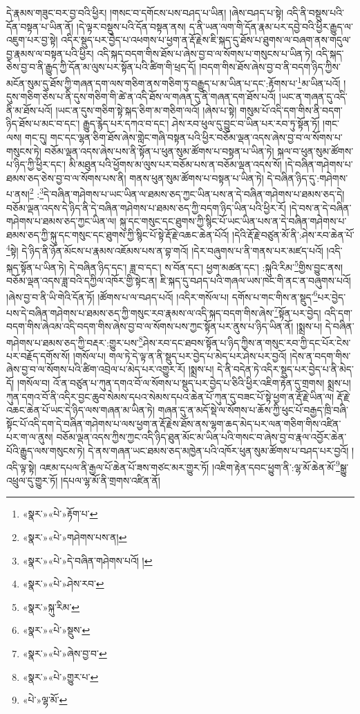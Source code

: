 དེ་རྣམས་གཟུང་བར་བྱ་བའི་ཕྱིར། །གསང་བ་དགོངས་པས་བཤད་པ་ཡིན། །ཞེས་བཤད་པ་སྟེ། འདི་ནི་བསྡུས་པའི་དོན་བསྟན་པ་ཡིན་ནོ། །དེ་ལྟར་བསྡུས་པའི་དོན་བསྟན་ནས། ད་ནི་ཡན་ལག་གི་དོན་རྣམ་པར་དབྱེ་བའི་ཕྱིར་རྒྱུད་ལ་འཇུག་པར་བྱ་སྟེ། འདིར་སྡུད་པར་བྱེད་པ་འཕགས་པ་ཕྱག་ན་རྡོ་རྗེས་ཇི་སྐད་དུ་ཐོས་པ་ཐུགས་ལ་བཞག་ནས་གདུལ་བྱ་རྣམས་ལ་བསྟན་པའི་ཕྱིར། འདི་སྐད་བདག་གིས་ཐོས་པ་ཞེས་བྱ་བ་ལ་སོགས་པ་གསུངས་པ་ཡིན་ཏེ། འདི་སྐད་ཅེས་བྱ་བ་ནི་རྒྱུད་ཀྱི་དོན་མ་ལུས་པར་སྟོན་པའི་ཚིག་གི་ཕྲད་དོ། །བདག་གིས་ཐོས་ཞེས་བྱ་བ་ནི་བདག་ཉིད་ཀྱིས་མངོན་སུམ་དུ་ཐོས་ཀྱི་གཞན་དག་ལས་གཅིག་ནས་གཅིག་ཏུ་བརྒྱུད་པ་མ་ཡིན་པ་དང་:རྟོགས་པ་\footnote{«སྣར་»«པེ་»རྟོག་པ་}མ་ཡིན་པའོ། །དུས་གཅིག་ཅེས་པ་ནི་དུས་གཅིག་གི་ཚེ་ན་འདི་ཐོས་ལ་གཞན་དུ་ནི་གཞན་དག་ཐོས་པའོ། །ཡང་ན་གཞན་དུ་འདི་ནི་མ་ཐོས་པའོ། །ཡང་ན་དུས་གཅིག་སྟེ་སྐད་ཅིག་མ་གཅིག་ལའོ། །ཞེས་པ་སྟེ། གསུམ་པོ་འདི་དག་གིས་ནི་བདག་ཉིད་ཐོས་པ་མང་བ་དང་། རྒྱུད་རྙེད་པར་དཀའ་བ་དང་། ཤེས་རབ་ཕུལ་དུ་བྱུང་བ་ཡིན་པར་རབ་ཏུ་སྟོན་ཏོ། །གང་ལས། གང་དུ། གང་དང་ལྷན་ཅིག་ཐོས་ཞེས་གླེང་གཞི་བསྟན་པའི་ཕྱིར་བཅོམ་ལྡན་འདས་ཞེས་བྱ་བ་ལ་སོགས་པ་གསུངས་ཏེ། བཅོམ་ལྡན་འདས་ཞེས་པས་ནི་སྟོན་པ་ཕུན་སུམ་ཚོགས་པ་བསྟན་པ་ཡིན་ཏེ། སྐལ་བ་ཕུན་སུམ་ཚོགས་པ་ཉིད་ཀྱི་ཕྱིར་དང་། མི་མཐུན་པའི་ཕྱོགས་མ་ལུས་པར་བཅོམ་པས་ན་བཅོམ་ལྡན་འདས་སོ། །དེ་བཞིན་གཤེགས་པ་ཐམས་ཅད་ཅེས་བྱ་བ་ལ་སོགས་པས་ནི། གནས་ཕུན་སུམ་ཚོགས་པ་བསྟན་པ་ཡིན་ཏེ། དེ་བཞིན་ཉིད་དུ་:གཤེགས་པ་ནས།\footnote{«སྣར་»«པེ་»གཤེགས་པས་ན།} :\footnote{«སྣར་»«པེ་»དེ་བཞིན་གཤེགས་པའོ། །}དེ་བཞིན་གཤེགས་པ་ཡང་ཡིན་ལ་ཐམས་ཅད་ཀྱང་ཡིན་པས་ན་དེ་བཞིན་གཤེགས་པ་ཐམས་ཅད་དེ། བཅོམ་ལྡན་འདས་དེ་ཉིད་ནི་དེ་བཞིན་གཤེགས་པ་ཐམས་ཅད་ཀྱི་བདག་ཉིད་ཡིན་པའི་ཕྱིར་རོ། །དེ་བས་ན་དེ་བཞིན་གཤེགས་པ་ཐམས་ཅད་ཀྱང་ཡིན་ལ། སྐུ་དང་གསུང་དང་ཐུགས་ཀྱི་སྙིང་པོ་ཡང་ཡིན་པས་ན་དེ་བཞིན་གཤེགས་པ་ཐམས་ཅད་ཀྱི་སྐུ་དང་གསུང་དང་ཐུགས་ཀྱི་སྙིང་པོ་སྟེ་རྡོ་རྗེ་འཆང་ཆེན་པོའོ། །དེའི་རྡོ་རྗེ་བཙུན་མོ་ནི་:ཤེས་རབ་ཆེན་པོ་\footnote{«སྣར་»«པེ་»ཤེས་རབ་}སྟེ། དེ་ཉིད་ནི་ཉོན་མོངས་པ་རྣམས་འཇོམས་པས་ན་བྷ་གའོ། །དེར་བཞུགས་པ་ནི་གནས་པར་མཛད་པའོ། །འདི་སྐད་སྟོན་པ་ཡིན་ཏེ། དེ་བཞིན་ཉིད་དང་། ཟླ་བ་དང་། ས་བོན་དང་། ཕྱག་མཚན་དང་། :སྐུའི་རིམ་\footnote{«སྣར་»སྐུ་རིམ་}གྱིས་བྱུང་ནས། བཅོམ་ལྡན་འདས་ཟླ་བའི་དཀྱིལ་འཁོར་གྱི་སྟེང་ན། ཇི་སྐད་དུ་བཤད་པའི་གཞལ་ཡས་ཁང་གི་ནང་ན་བཞུགས་པའོ། །ཞེས་བྱ་བ་ནི་ཡི་གེའི་དོན་ཏོ། །ཚོགས་པ་ལ་བཤད་པའོ། །འདིར་གསོལ་པ། དགོས་པ་གང་གིས་ན་སྡུད་\footnote{«སྣར་»«པེ་»སྡུས་}པར་བྱེད་པས་དེ་བཞིན་གཤེགས་པ་ཐམས་ཅད་ཀྱི་གསུང་རབ་རྣམས་ལ་འདི་སྐད་བདག་གིས་ཞེས་\footnote{«སྣར་»«པེ་»ཞེས་བྱ་བ་}སྟོན་པར་བྱེད། འདི་དག་བདག་གིས་ཞེའམ་འདི་བདག་གིས་ཞེས་བྱ་བ་ལ་སོགས་པས་ཀྱང་སྟོན་པར་ནུས་པ་ཉིད་ཡིན་ནོ། །སྨྲས་པ། དེ་བཞིན་གཤེགས་པ་ཐམས་ཅད་ཀྱི་བརྡར་:གྱུར་པས་\footnote{«སྣར་»«པེ་»གྱུར་པ་}ཤེས་རབ་དང་ཐབས་སྟོན་པ་ཉིད་ཀྱིས་ན་གསུང་རབ་ཀྱི་དང་པོར་ངེས་པར་བརྗོད་དགོས་སོ། །གསོལ་པ། གལ་ཏེ་དེ་ལྟ་ན་ནི་སྡུད་པར་བྱེད་པ་མེད་པར་ཤེས་པར་བྱའོ། །དེས་ན་བདག་གིས་ཞེས་བྱ་བ་ལ་སོགས་པའི་ཚིག་འབྲེལ་པ་མེད་པར་འགྱུར་རོ། །སྨྲས་པ། དེ་ནི་བདེན་ཏེ་འདིར་སྡུད་པར་བྱེད་པ་ནི་མེད་དོ། །གསོལ་བ། འོ་ན་བཙུན་པ་ཀུན་དགའ་བོ་ལ་སོགས་པ་སྡུད་པར་བྱེད་པ་ཅིའི་ཕྱིར་འཇིག་རྟེན་དུ་གྲགས། སྨྲས་པ། ཀུན་དགའ་བོ་ནི་འདིར་བྱང་ཆུབ་སེམས་དཔའ་སེམས་དཔའ་ཆེན་པོ་ཀུན་དུ་བཟང་པོ་སྟེ་ཕྱག་ན་རྡོ་རྗེ་ཡིན་ལ། རྡོ་རྗེ་འཆང་ཆེན་པོ་ཡང་དེ་ཉིད་ལས་གཞན་མ་ཡིན་ཏེ། གཞན་དུ་ན་མདོ་སྡེ་ལ་སོགས་པ་ཆོས་ཀྱི་ཕུང་པོ་བརྒྱད་ཁྲི་བཞི་སྟོང་པོ་འདི་དག་དེ་བཞིན་གཤེགས་པ་ལས་ཕྱག་ན་རྡོ་རྗེས་ཐོས་ནས་ལྷག་ཆད་མེད་པར་ལན་གཅིག་གིས་འཛིན་པར་ག་ལ་ནུས། བཅོམ་ལྡན་འདས་ཀྱིས་ཀྱང་འདི་ཉིད་ཐུན་མོང་མ་ཡིན་པའི་གསང་བ་ཞེས་བྱ་བ་རྣལ་འབྱོར་ཆེན་པོའི་རྒྱུད་ལས་གསུངས་ཏེ། དེ་ནས་གཞན་ཡང་ཐམས་ཅད་མཁྱེན་པའི་འཁོར་ཕུན་སུམ་ཚོགས་པ་བཤད་པར་བྱའོ། །འདི་ལྟ་སྟེ། འཇམ་དཔལ་ནི་རྒྱལ་པོ་ཆེན་པོ་ཟས་གཙང་མར་གྱུར་ཏོ། །འཇིག་རྟེན་དབང་ཕྱུག་ནི་:ལྷ་མོ་ཆེན་མོ་\footnote{«པེ་»ལྷ་མོ་}སྒྱུ་འཕྲུལ་དུ་གྱུར་ཏོ། །དཔལ་ལྷ་མོ་ནི་གྲགས་འཛིན་ནོ། 